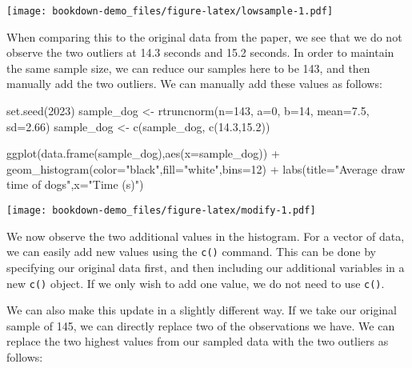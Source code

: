 \documentclass[
]{book}
\newenvironment{Shaded}{\begin{snugshade}}{\end{snugshade}}
\newcommand{\AttributeTok}[1]{\textcolor[rgb]{0.77,0.63,0.00}{#1}}
\newcommand{\DecValTok}[1]{\textcolor[rgb]{0.00,0.00,0.81}{#1}}
\newcommand{\FloatTok}[1]{\textcolor[rgb]{0.00,0.00,0.81}{#1}}
\newcommand{\FunctionTok}[1]{\textcolor[rgb]{0.00,0.00,0.00}{#1}}
\newcommand{\NormalTok}[1]{#1}
\newcommand{\OtherTok}[1]{\textcolor[rgb]{0.56,0.35,0.01}{#1}}
\newcommand{\SpecialCharTok}[1]{\textcolor[rgb]{0.00,0.00,0.00}{#1}}
\newcommand{\StringTok}[1]{\textcolor[rgb]{0.31,0.60,0.02}{#1}}
\begin{document}
\texttt{[image: bookdown-demo\_files/figure-latex/lowsample-1.pdf]}

When comparing this to the original data from the paper, we see that we do not observe the two outliers at 14.3 seconds and 15.2 seconds. In order to maintain the same sample size, we can reduce our samples here to be 143, and then manually add the two outliers. We can manually add these values as follows:

\begin{Shaded}
\begin{Highlighting}[]
\FunctionTok{set.seed}\NormalTok{(}\DecValTok{2023}\NormalTok{)}
\NormalTok{sample\_dog }\OtherTok{\textless{}{-}} \FunctionTok{rtruncnorm}\NormalTok{(}\AttributeTok{n=}\DecValTok{143}\NormalTok{, }\AttributeTok{a=}\DecValTok{0}\NormalTok{, }\AttributeTok{b=}\DecValTok{14}\NormalTok{, }\AttributeTok{mean=}\FloatTok{7.5}\NormalTok{, }\AttributeTok{sd=}\FloatTok{2.66}\NormalTok{)}
\NormalTok{sample\_dog }\OtherTok{\textless{}{-}} \FunctionTok{c}\NormalTok{(sample\_dog, }\FunctionTok{c}\NormalTok{(}\FloatTok{14.3}\NormalTok{,}\FloatTok{15.2}\NormalTok{))}

\FunctionTok{ggplot}\NormalTok{(}\FunctionTok{data.frame}\NormalTok{(sample\_dog),}\FunctionTok{aes}\NormalTok{(}\AttributeTok{x=}\NormalTok{sample\_dog)) }\SpecialCharTok{+} \FunctionTok{geom\_histogram}\NormalTok{(}\AttributeTok{color=}\StringTok{"black"}\NormalTok{,}\AttributeTok{fill=}\StringTok{"white"}\NormalTok{,}\AttributeTok{bins=}\DecValTok{12}\NormalTok{) }\SpecialCharTok{+} 
            \FunctionTok{labs}\NormalTok{(}\AttributeTok{title=}\StringTok{"Average draw time of dogs"}\NormalTok{,}\AttributeTok{x=}\StringTok{"Time (s)"}\NormalTok{)}
\end{Highlighting}
\end{Shaded}

\texttt{[image: bookdown-demo\_files/figure-latex/modify-1.pdf]}

We now observe the two additional values in the histogram. For a vector of data, we can easily add new values using the \texttt{c()} command. This can be done by specifying our original data first, and then including our additional variables in a new \texttt{c()} object. If we only wish to add one value, we do not need to use \texttt{c()}.

We can also make this update in a slightly different way. If we take our original sample of 145, we can directly replace two of the observations we have. We can replace the two highest values from our sampled data with the two outliers as follows:
\end{document}
